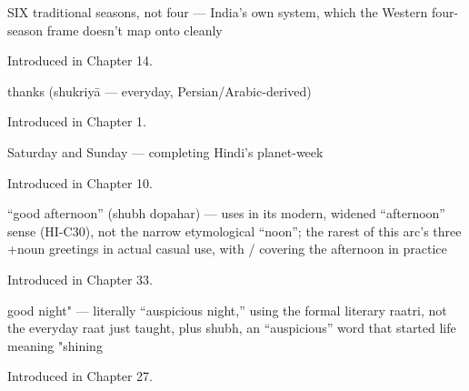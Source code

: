 \noindent\begin{minipage}[t]{\linewidth}
\raggedright
\textbf{     }\par
\small SIX traditional seasons, not four — India's own  system, which the Western four-season frame doesn't map onto cleanly\par
\footnotesize Introduced in Chapter 14.
\end{minipage}\par\medskip

\noindent\begin{minipage}[t]{\linewidth}
\raggedright
\textbf{}\par
\small thanks (shukriyā — everyday, Persian/Arabic-derived)\par
\footnotesize Introduced in Chapter 1.
\end{minipage}\par\medskip

\noindent\begin{minipage}[t]{\linewidth}
\raggedright
\textbf{ }\par
\small Saturday and Sunday — completing Hindi's planet-week\par
\footnotesize Introduced in Chapter 10.
\end{minipage}\par\medskip

\noindent\begin{minipage}[t]{\linewidth}
\raggedright
\textbf{ }\par
\small \textquotedblleft{}good afternoon\textquotedblright{} (shubh dopahar) — uses  in its modern, widened \textquotedblleft{}afternoon\textquotedblright{} sense (HI-C30), not the narrow etymological \textquotedblleft{}noon\textquotedblright{}; the rarest of this arc's three +noun greetings in actual casual use, with / covering the afternoon in practice\par
\footnotesize Introduced in Chapter 33.
\end{minipage}\par\medskip

\noindent\begin{minipage}[t]{\linewidth}
\raggedright
\textbf{ }\par
\small good night" — literally \textquotedblleft{}auspicious night,\textquotedblright{} using the formal literary raatri, not the everyday raat just taught, plus shubh, an \textquotedblleft{}auspicious\textquotedblright{} word that started life meaning "shining\par
\footnotesize Introduced in Chapter 27.
\end{minipage}\par\medskip

